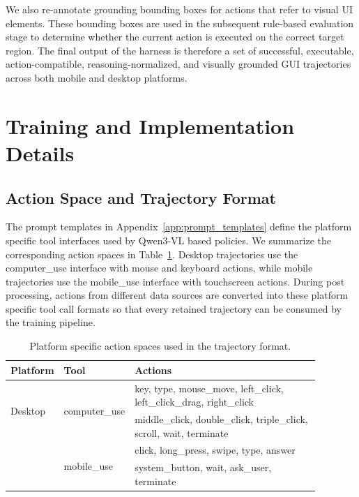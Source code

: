 We also re-annotate grounding bounding boxes for actions that refer to visual
UI elements. These bounding boxes are used in the subsequent rule-based
evaluation stage to determine whether the current action is executed on the
correct target region. The final output of the harness is therefore a set of
successful, executable, action-compatible, reasoning-normalized, and visually
grounded GUI trajectories across both mobile and desktop platforms.




\section{Training and Implementation Details}

\subsection{Action Space and Trajectory Format}

The prompt templates in Appendix~\ref{app:prompt_templates} define the
platform specific tool interfaces used by Qwen3-VL based policies. We
summarize the corresponding action spaces in Table~\ref{tab:action_space}.
Desktop trajectories use the computer\_use interface with
mouse and keyboard actions, while mobile trajectories use the
mobile\_use interface with touchscreen actions. During
post processing, actions from different data sources are converted into these
platform specific tool call formats so that every retained trajectory can be consumed by the training pipeline.

\begin{table}[h]
\centering
\caption{Platform specific action spaces used in the trajectory format.}
\label{tab:action_space}
\normalsize
\setlength{\tabcolsep}{8pt}
\renewcommand{\arraystretch}{1.18}
\begin{tabular}{p{0.11\linewidth}p{0.15\linewidth}p{0.62\linewidth}}
\toprule
\textbf{Platform} & \textbf{Tool} & \textbf{Actions} \\
\midrule
\multirow{2}{*}{Desktop} &
\multirow{2}{*}{computer\_use} &
key, type, mouse\_move, left\_click, left\_click\_drag, right\_click \\
& & middle\_click, double\_click, triple\_click, scroll, wait, terminate \\
\addlinespace[5pt]
\multirow{2}{*}{Mobile} &
\multirow{2}{*}{mobile\_use} &
click, long\_press, swipe, type, answer \\
& & system\_button, wait, ask\_user, terminate \\
\bottomrule
\end{tabular}
\end{table}

